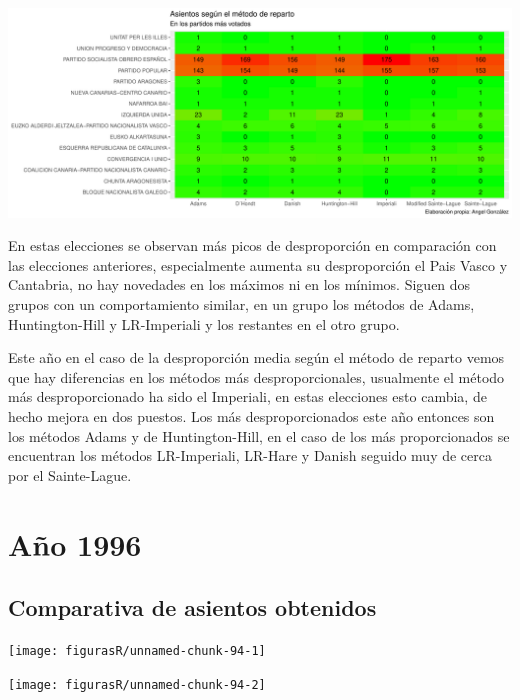 \documentclass[12pt,a4paper,]{book}
\numberwithin{dummy}{section}
\theoremstyle{ocrenumbox}
\theoremstyle{blacknumex}
\theoremstyle{blacknumbox}
\theoremstyle{ocrenum}
\theoremstyle{ocrenum}
\begin{document}
\begin{center}\includegraphics[width=1\linewidth]{figurasR/unnamed-chunk-92-2} \end{center}

En estas elecciones se observan más picos de desproporción en
comparación con las elecciones anteriores, especialmente aumenta su
desproporción el Pais Vasco y Cantabria, no hay novedades en los máximos
ni en los mínimos. Siguen dos grupos con un comportamiento similar, en
un grupo los métodos de Adams, Huntington-Hill y LR-Imperiali y los
restantes en el otro grupo.

Este año en el caso de la desproporción media según el método de reparto
vemos que hay diferencias en los métodos más desproporcionales,
usualmente el método más desproporcionado ha sido el Imperiali, en estas
elecciones esto cambia, de hecho mejora en dos puestos. Los más
desproporcionados este año entonces son los métodos Adams y de
Huntington-Hill, en el caso de los más proporcionados se encuentran los
métodos LR-Imperiali, LR-Hare y Danish seguido muy de cerca por el
Sainte-Lague.

\hypertarget{auxf1o-1996}{%
\section{Año 1996}\label{auxf1o-1996}}

\hypertarget{comparativa-de-asientos-obtenidos-6}{%
\subsection{Comparativa de asientos
obtenidos}\label{comparativa-de-asientos-obtenidos-6}}

\begin{center}\texttt{[image: figurasR/unnamed-chunk-94-1]} \end{center}

\begin{center}\texttt{[image: figurasR/unnamed-chunk-94-2]} \end{center}
\end{document}
